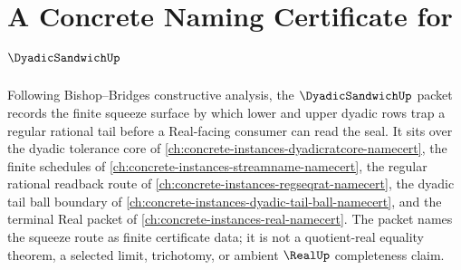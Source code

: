 \chapter{A Concrete Naming Certificate for $\DyadicSandwichUp$}
\label{ch:concrete-instances-dyadic-sandwich-namecert}

Following Bishop--Bridges constructive analysis, the $\DyadicSandwichUp$ packet records the finite squeeze surface by which lower and upper dyadic rows trap a regular rational tail before a Real-facing consumer can read the seal. It sits over the dyadic tolerance core of \autoref{ch:concrete-instances-dyadicratcore-namecert}, the finite schedules of \autoref{ch:concrete-instances-streamname-namecert}, the regular rational readback route of \autoref{ch:concrete-instances-regseqrat-namecert}, the dyadic tail ball boundary of \autoref{ch:concrete-instances-dyadic-tail-ball-namecert}, and the terminal Real packet of \autoref{ch:concrete-instances-real-namecert}. The packet names the squeeze route as finite certificate data; it is not a quotient-real equality theorem, a selected limit, trichotomy, or ambient $\RealUp$ completeness claim.

